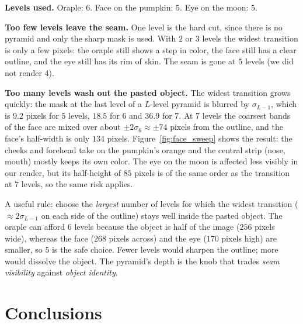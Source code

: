\documentclass[11pt,a4paper]{article}
\begin{document}
\clearpage
\begin{answerbox}
\textbf{Levels used.} Oraple: $6$. Face on the pumpkin: $5$. Eye on the moon: $5$.

\textbf{Too few levels leave the seam.} One level is the hard cut, since there is no pyramid and only the sharp mask is used. With $2$ or $3$ levels the widest transition is only a few pixels:
the oraple still shows a step in color, the face still has a clear outline, and the eye still has its rim of skin. The seam is gone at $5$ levels (we did not render $4$).

\textbf{Too many levels wash out the pasted object.} The widest transition grows quickly: the mask at the last level of a $L$-level pyramid is blurred by $\sigma_{L-1}$, which is
$9.2$ pixels for $5$ levels, $18.5$ for $6$ and $36.9$ for $7$. At $7$ levels the coarsest bands of the face are mixed over about $\pm2\sigma_6\approx\pm74$ pixels
from the outline, and the face's half-width is only $134$ pixels. Figure~\ref{fig:face_sweep} shows the result: the cheeks and forehead take on the pumpkin's orange and the central strip (nose, mouth) mostly keeps
its own color. The eye on the moon is affected less visibly in our render, but its half-height of $85$ pixels is of the same order as the transition at $7$ levels, so the same risk applies.
\end{answerbox}

\begin{whybox}
A useful rule: choose the \emph{largest} number of levels for which the widest transition ($\approx2\sigma_{L-1}$ on each side of the outline) stays well inside the pasted object. The oraple
can afford $6$ levels because the object is half of the image ($256$ pixels wide), whereas the face ($268$ pixels across) and the eye ($170$ pixels high) are
smaller, so $5$ is the safe choice. Fewer levels would sharpen the outline; more would dissolve the object. The pyramid's depth is the knob that trades \emph{seam visibility} against \emph{object identity}.
\end{whybox}

\section{Conclusions}
\end{document}
